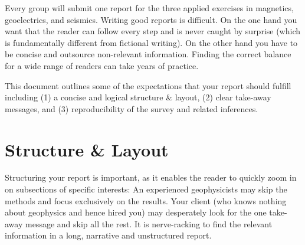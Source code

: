 \documentclass[letterpaper]{inzane_syllabus} %
\begin{document}

\makeprofile %

Every group will submit one report for the three applied exercises in magnetics, geoelectrics, and seismics. Writing good reports is difficult. On the one hand you want that the reader can follow every step and is never caught by surprise (which is fundamentally different from fictional writing). On the other hand you have to be concise and outsource non-relevant information. Finding the correct balance for a wide range of readers can take years of practice. 


This document outlines some of the expectations that your report should fulfill including (1) a concise and logical structure \& layout, (2) clear take-away messages, and (3) reproducibility of the survey and related inferences.\\

\section{Structure \& Layout}

Structuring your report is important, as it enables the reader to quickly zoom in on subsections of specific interests: An experienced geophysicists may skip the methods and focus exclusively on the results. Your client (who knows nothing about geophysics and hence hired you) may desperately look for the one take-away message and skip all the rest. It is nerve-racking to find the relevant information in a long, narrative and unstructured report. 
\end{document}
